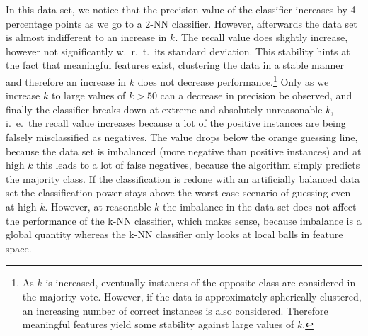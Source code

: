 \documentclass[12pt, a4paper]{scrartcl}
\begin{document}
In this data set, we notice that the precision value of the classifier increases by 4 percentage points as we go to a 2-NN classifier. However, afterwards the data set is almost indifferent to an increase in $k$.  The recall value does slightly increase, however not significantly w.\ r.\ t.\ its standard deviation. This stability hints at the fact that meaningful features exist, clustering the data in a stable manner and therefore an increase in $k$ does not decrease performance.\footnote{As $k$ is increased, eventually instances of the opposite class are considered in the majority vote. However, if the data is approximately spherically clustered, an increasing number of correct instances is also considered. Therefore meaningful features yield some stability against large values of $k$.}
Only as we increase $k$ to large values of $k>50$ can a decrease in precision be observed, and finally the classifier breaks down at extreme and absolutely unreasonable $k$, i.\ e.\ the recall value increases because a lot of the positive instances are being falsely misclassified as negatives. The value drops below the orange guessing line, because the data set is imbalanced (more negative than positive instances) and at high $k$ this leads to a lot of false negatives, because the algorithm simply predicts the majority class. If the classification is redone with an artificially balanced data set the classification power stays above the worst case scenario of guessing even at high $k$.
However, at reasonable $k$ the imbalance in the data set does not affect the performance of the k-NN classifier, which makes sense, because imbalance is a global quantity whereas the k-NN classifier only looks at local balls in feature space.
\end{document}
